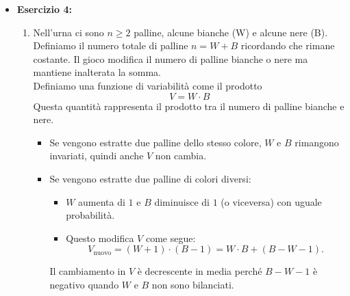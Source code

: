 \documentclass[a4paper,12pt]{article}
\begin{document}
\begin{itemize}
\begin{enumerate} [label=\alph*)]
\[			\]
			\item In due ore, il numero di oggetti che passano l'ispezione segue un processo di Poisson con tasso:\\
			\[\lambda_{pass}=2 \cdot \lambda \cdot p
			\]
			Dobbiamo calcolare la probabilità che meno di 3 oggetti passino:\\
			\[
			P(\text{meno di 3 passano})=P(X<3)
			\]
			Usiamo la formula della distribuzione di Poisson:
			\[
			P(X < 3) = P(X = 0) + P(X = 1) + P(X = 2)
			\]
			\[
			P(X < 3) = e^{-\lambda_{\text{pass}}} \left( 1 + \lambda_{\text{pass}} + \frac{\lambda_{\text{pass}}^2}{2} \right).
			\]
			
			\item Iniziamo a calcolare il tasso effettivo di arrivo al centro macchine, ovvero:\\
			\[\lambda_{eff}=\lambda +(1-p)\frac{\lambda}{p}=\frac{\lambda}{p}
			\]
			Adesso posso calcolare il numero medio di pezzi al centro macchine\\
			\[
			\mathbb{E}[N_{\text{macchine}}] = \frac{\lambda_{\text{eff}}}{\mu_1 - \lambda_{\text{eff}}}.
			\]
			
		\end{enumerate}
		\newpage
		\item \textbf{Esercizio 4: }
		\begin{enumerate} [label=\alph*)]
			\item Nell'urna ci sono $n \geq 2$ palline, alcune bianche (W) e alcune nere (B). Definiamo il numero totale di palline $n=W+B$ ricordando che rimane costante. Il gioco modifica il numero di palline bianche o nere ma mantiene inalterata la somma.\\
			Definiamo una funzione di variabilità come il prodotto
			\[ V= W \cdot B\]
			Questa quantità rappresenta il prodotto tra il numero di palline bianche e nere.
			\begin{itemize}
				\item {} Se vengono estratte due palline dello stesso colore, $W$ e $B$ rimangono invariati, quindi anche $V$ non cambia.
				\item {} Se vengono estratte due palline di colori diversi:
				\begin{itemize}
					\item $W$ aumenta di $1$ e $B$ diminuisce di $1$ (o viceversa) con uguale probabilità.
					\item Questo modifica $V$ come segue:
					$$
					V_{\text{nuovo}} = (W + 1) \cdot (B - 1) = W \cdot B + (B - W - 1).
					$$
				\end{itemize}
				Il cambiamento in $V$ è decrescente in media perché $B - W - 1$ è negativo quando $W$ e $B$ non sono bilanciati.
			\end{itemize}
			

\end{enumerate}
\end{itemize}
\end{document}
